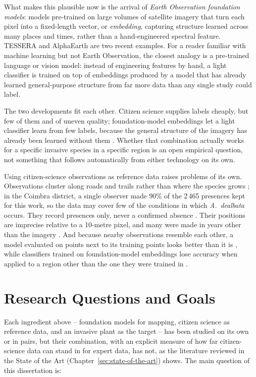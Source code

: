 What makes this plausible now is the arrival of \emph{Earth
Observation foundation models}: models pre-trained on large volumes of
satellite imagery that turn each pixel into a fixed-length vector, or
\emph{embedding}, capturing structure learned across many places and
times, rather than a hand-engineered spectral feature. TESSERA
\cite{feng2025} and AlphaEarth \cite{brown2025} are two recent
examples. For a reader familiar with machine learning but not Earth
Observation, the closest analogy is a pre-trained language or vision
model: instead of engineering features by hand, a light classifier is
trained on top of embeddings produced by a model that has already
learned general-purpose structure from far more data than any single
study could label.

The two developments fit each other. Citizen science supplies labels
cheaply, but few of them and of uneven quality; foundation-model
embeddings let a light classifier learn from few labels, because the
general structure of the imagery has already been learned without
them \cite{ball2026}. Whether that combination actually works for a
specific invasive species in a specific region is an open empirical
question, not something that follows automatically from either
technology on its own.

Using citizen-science observations as reference data raises problems
of its own. Observations cluster along roads and trails rather than
where the species grows \cite{dimson2023}; in the Coimbra district, a
single observer made 90\% of the 2\,465 presences kept for this work,
so the data may cover few of the conditions in which
\emph{A.~dealbata} occurs. They record presences only, never a
confirmed absence \cite{phillips2009}. Their positions are imprecise
relative to a 10-metre pixel, and many were made in years other than
the imagery \cite{ball2026}. And because nearby observations resemble
each other, a model evaluated on points next to its training points
looks better than it is \cite{karasiak2022}, while classifiers trained
on foundation-model embeddings lose accuracy when applied to a region
other than the one they were trained in \cite{yang2026}.

\section{Research Questions and Goals}
\label{sec:introduction-rqs}

Each ingredient above -- foundation models for mapping, citizen
science as reference data, and an invasive plant as the target -- has
been studied on its own or in pairs, but their combination, with an
explicit measure of how far citizen-science data can stand in for
expert data, has not, as the literature reviewed in the State of the
Art (Chapter~\ref{sec:state-of-the-art}) shows. The main
question of this dissertation is:

